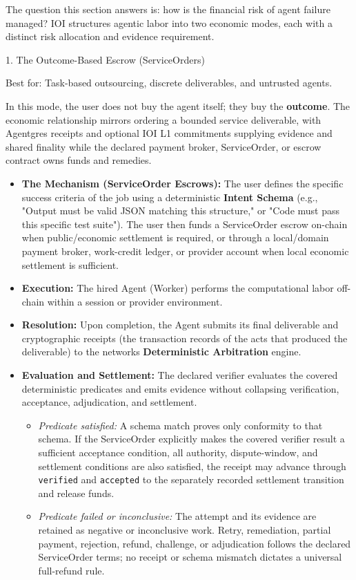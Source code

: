 \documentclass[
  11pt,
]{article}
\providecommand{\tightlist}{%
  \setlength{\itemsep}{0pt}\setlength{\parskip}{0pt}}
\begin{document}
The question this section answers is: how is the financial risk of agent
failure managed? IOI structures agentic labor into two economic modes,
each with a distinct risk allocation and evidence requirement.

1. The Outcome-Based Escrow (ServiceOrders)

Best for: Task-based outsourcing, discrete deliverables, and untrusted
agents.

In this mode, the user does not buy the agent itself; they buy the
\textbf{outcome}. The economic relationship mirrors ordering a bounded
service deliverable, with Agentgres receipts and optional IOI L1
commitments supplying evidence and shared finality while the declared payment
broker, ServiceOrder, or escrow contract owns funds and remedies.

\begin{itemize}
\item
  \textbf{The Mechanism (ServiceOrder Escrows):} The user defines the
  specific success criteria of the job using a deterministic
  \textbf{Intent Schema} (e.g., "Output must be valid JSON matching this
  structure," or "Code must pass this specific test suite"). The user
  then funds a ServiceOrder escrow on-chain when public/economic
  settlement is required, or through a local/domain payment broker,
  work-credit ledger, or provider account when local economic settlement is
  sufficient.
\item
  \textbf{Execution:} The hired Agent (Worker) performs the
  computational labor off-chain within a session or provider
  environment.
\item
  \textbf{Resolution:} Upon completion, the Agent submits its final
  deliverable and cryptographic receipts (the transaction records of the
  acts that produced the deliverable) to the network\textquotesingle s
  \textbf{Deterministic Arbitration} engine.
\item
  \textbf{Evaluation and Settlement:} The declared verifier evaluates the
  covered deterministic predicates and emits evidence without collapsing
  verification, acceptance, adjudication, and settlement.

  \begin{itemize}
  \tightlist
  \item
    \emph{Predicate satisfied:} A schema match proves only conformity to that
    schema. If the ServiceOrder explicitly makes the covered verifier result a
    sufficient acceptance condition, all authority, dispute-window, and
    settlement conditions are also satisfied, the receipt may advance through
    \texttt{verified} and \texttt{accepted} to the separately recorded
    settlement transition and release funds.
  \item
    \emph{Predicate failed or inconclusive:} The attempt and its evidence are
    retained as negative or inconclusive work. Retry, remediation, partial
    payment, rejection, refund, challenge, or adjudication follows the declared
    ServiceOrder terms; no receipt or schema mismatch dictates a universal
    full-refund rule.
  \end{itemize}
\end{itemize}
\end{document}
